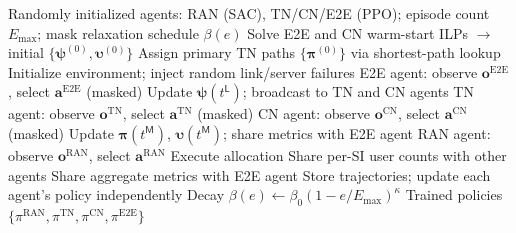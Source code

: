 \documentclass[12pt,lettersize,journal,onecolumn]{IEEEtran}
\begin{document}
\begin{algorithm}[t]
\caption{ENSURE Training Procedure}
\label{alg:training}
\normalsize
\begin{algorithmic}[1]
\Require Randomly initialized agents: RAN (SAC), TN/CN/E2E (PPO); episode count $E_{\max}$; mask relaxation schedule $\beta(e)$
    \State Solve E2E and CN warm-start ILPs $\to$ initial $\{\boldsymbol{\psi}^{(0)}, \boldsymbol{\upsilon}^{(0)}\}$ %
    \State Assign primary TN paths $\{\boldsymbol{\pi}^{(0)}\}$ via shortest-path lookup %
    \State Initialize environment; inject random link/server failures
        \State E2E agent: observe $\mathbf{o}^{\text{E2E}}$, select $\mathbf{a}^{\text{E2E}}$ (masked)
        \State Update $\boldsymbol{\psi}(t^\mathsf{L})$; broadcast to TN and CN agents
            \State TN agent: observe $\mathbf{o}^{\text{TN}}$, select $\mathbf{a}^{\text{TN}}$ (masked)
            \State CN agent: observe $\mathbf{o}^{\text{CN}}$, select $\mathbf{a}^{\text{CN}}$ (masked)
            \State Update $\boldsymbol{\pi}(t^\mathsf{M})$, $\boldsymbol{\upsilon}(t^\mathsf{M})$; share metrics with E2E agent
                \State RAN agent: observe $\mathbf{o}^{\text{RAN}}$, select $\mathbf{a}^{\text{RAN}}$
                \State Execute allocation
                \Statex \hspace{4.44em}\phantom{14:}\;Share per-SI user counts with other agents
                \Statex \hspace{4.44em}\phantom{14:}\;Share aggregate metrics with E2E agent                
            \EndFor
        \EndFor
    \EndFor
    \State Store trajectories; update each agent's policy independently
    \State Decay $\beta(e) \gets \beta_0(1 - e/E_{\max})^\kappa$
\EndFor
\State \Return Trained policies $\{\pi^{\text{RAN}}, \pi^{\text{TN}}, \pi^{\text{CN}}, \pi^{\text{E2E}}\}$
\end{algorithmic}
\end{algorithm}
\end{document}
